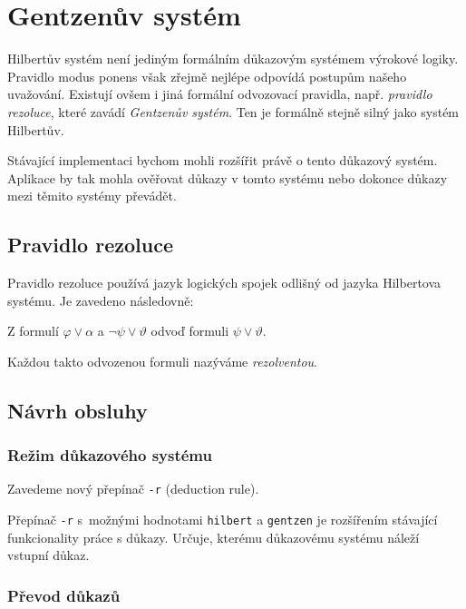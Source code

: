 \documentclass[thesis=B,czech,hidelinks]{thesis}[2012/06/26]
\begin{document}
\section{Gentzenův systém}

Hilbertův systém není jediným formálním důkazovým systémem výrokové logiky. Pravidlo modus ponens však zřejmě nejlépe odpovídá postupům našeho uvažování\cite{sochor}. Existují ovšem i jiná formální odvozovací pravidla, např. \emph{pravidlo rezoluce}, které zavádí \emph{Gentzenův systém}. Ten je formálně stejně silný jako systém Hilbertův\cite{stary}.

Stávající implementaci bychom mohli rozšířit právě o tento důkazový systém. Aplikace by tak mohla ověřovat důkazy v tomto systému nebo dokonce důkazy mezi těmito systémy převádět.

\subsection{Pravidlo rezoluce}

Pravidlo rezoluce používá jazyk logických spojek odlišný od jazyka Hilbertova systému. Je zavedeno následovně:

\begin{dfn}
Z formulí $\varphi \vee \alpha$ a $\neg \psi \vee \vartheta$ odvoď formuli $\psi \vee \vartheta$\cite{sochor}.
\end{dfn}

Každou takto odvozenou formuli nazýváme \emph{rezolventou}.

\subsection{Návrh obsluhy}

\subsubsection{Režim důkazového systému}

Zavedeme nový přepínač \texttt{-r} (deduction rule).

Přepínač \texttt{-r} s~možnými hodnotami \texttt{hilbert} a \texttt{gentzen} je rozšířením stávající funkcionality práce s důkazy. Určuje, kterému důkazovému systému náleží vstupní důkaz.

\subsubsection{Převod důkazů}
\end{document}
